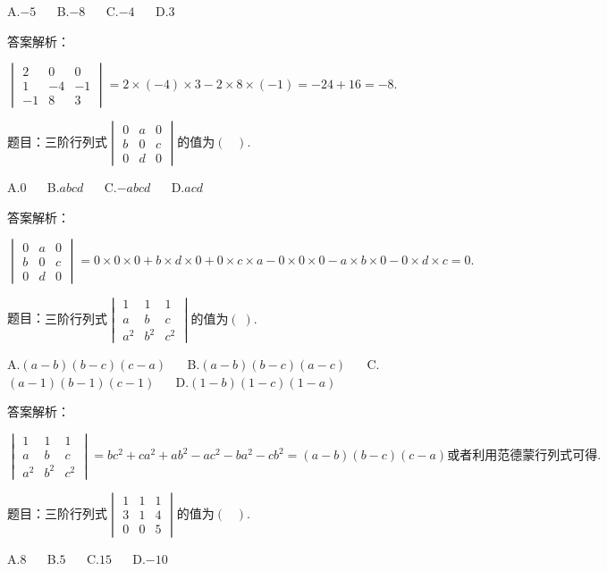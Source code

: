 A.$-5$ $\quad$ B.$-8$ $\quad$ C.$-4$ $\quad$ D.$3$

答案解析：

$\begin{vmatrix}2&0&0\\1&-4&-1\\-1&8&3\end{vmatrix}=2\times(-4)\times3-2\times8\times(-1)=-24+16=-8.$



题目：$\mathrm{三阶行列式}\begin{vmatrix}0&a&0\\b&0&c\\0&d&0\end{vmatrix}\mathrm{的值为}(\;\;\;).$

A.$0$ $\quad$ B.$abcd$ $\quad$ C.$-abcd$ $\quad$ D.$acd$

答案解析：

$\begin{vmatrix}0&a&0\\b&0&c\\0&d&0\end{vmatrix}=0\times0\times0+b\times d\times0+0\times c\times a-0\times0\times0-a\times b\times0-0\times d\times c=0.$



题目：$\mathrm{三阶行列式}\begin{vmatrix}1&1&1\\a&b&c\\a^2&b^2&c^2\end{vmatrix}\mathrm{的值为}(\;).$

A.$(a-b)(b-c)(c-a)$ $\quad$ B.$(a-b)(b-c)(a-c)$ $\quad$ C.$(a-1)(b-1)(c-1)$ $\quad$ D.$(1-b)(1-c)(1-a)$

答案解析：

$\begin{vmatrix}1&1&1\\a&b&c\\a^2&b^2&c^2\end{vmatrix}=bc^2+ca^2+ab^2-ac^2-ba^2-cb^2=(a-b)(b-c)(c-a)\mathrm{或者利用范德蒙行列式可得}.$



题目：$\mathrm{三阶行列式}\begin{vmatrix}1&1&1\\3&1&4\\0&0&5\end{vmatrix}\mathrm{的值为}(\;\;\;).$

A.$8$ $\quad$ B.$5$ $\quad$ C.$15$ $\quad$ D.$-10$

